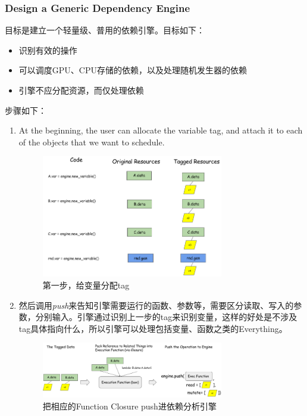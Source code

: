 \subsubsection{Design a Generic Dependency Engine}

目标是建立一个轻量级、普用的依赖引擎。目标如下：
\begin{itemize}
\item 识别有效的操作
\item 可以调度GPU、CPU存储的依赖，以及处理随机发生器的依赖
\item 引擎不应分配资源，而仅处理依赖
\end{itemize}

步骤如下：

\begin{enumerate}
\item At the beginning, the user can allocate the variable tag, and attach it to each of the objects that we want to schedule.

\begin{figure}[!hbtp]
\centering
\includegraphics[width=0.75\textwidth]{MXNet/Tag1.png}
\caption{第一步，给变量分配tag}
\label{Tag1}
\end{figure}

\item 然后调用\textit{push}来告知引擎需要运行的函数、参数等，需要区分读取、写入的参数，分别输入。引擎通过识别上一步的tag来识别变量，这样的好处是不涉及tag具体指向什么，所以引擎可以处理包括变量、函数之类的Everything。

\begin{figure}[!hbtp]
\centering
\includegraphics[width=0.75\textwidth]{MXNet/Tag2.png}
\caption{把相应的Function Closure push进依赖分析引擎}
\label{Tag2}
\end{figure}
\end{enumerate}

